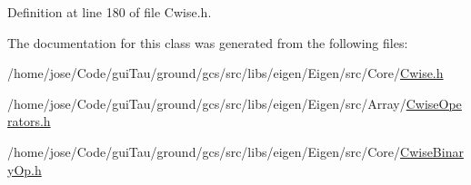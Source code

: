 Definition at line 180 of file Cwise.\-h.



The documentation for this class was generated from the following files\-:\begin{DoxyCompactItemize}
\item 
/home/jose/\-Code/gui\-Tau/ground/gcs/src/libs/eigen/\-Eigen/src/\-Core/\hyperlink{_cwise_8h}{Cwise.\-h}\item 
/home/jose/\-Code/gui\-Tau/ground/gcs/src/libs/eigen/\-Eigen/src/\-Array/\hyperlink{_cwise_operators_8h}{Cwise\-Operators.\-h}\item 
/home/jose/\-Code/gui\-Tau/ground/gcs/src/libs/eigen/\-Eigen/src/\-Core/\hyperlink{_cwise_binary_op_8h}{Cwise\-Binary\-Op.\-h}\end{DoxyCompactItemize}
